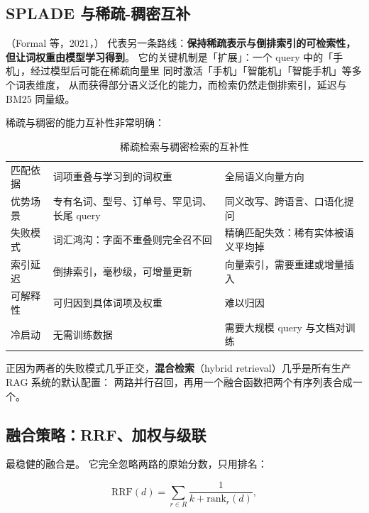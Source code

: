 \subsection{SPLADE 与稀疏-稠密互补}

（Formal 等，2021，\cite{formal2021splade}）
代表另一条路线：\textbf{保持稀疏表示与倒排索引的可检索性，但让词权重由模型学习得到}。
它的关键机制是「扩展」：一个 query 中的「手机」，经过模型后可能在稀疏向量里
同时激活「手机」「智能机」「智能手机」等多个词表维度，
从而获得部分语义泛化的能力，而检索仍然走倒排索引，延迟与 BM25 同量级。

稀疏与稠密的能力互补性非常明确：

\begin{table}[htbp]
\centering
\caption{稀疏检索与稠密检索的互补性}
\label{tab:sparse-dense}
\small
\begin{tabularx}{\textwidth}{L{2.6cm} L{4.6cm} Y}
\toprule
{} &  &  \\
\midrule
匹配依据 & 词项重叠与学习到的词权重 & 全局语义向量方向 \\
\addlinespace
优势场景 & 专有名词、型号、订单号、罕见词、长尾 query & 同义改写、跨语言、口语化提问 \\
\addlinespace
失败模式 & 词汇鸿沟：字面不重叠则完全召不回 & 精确匹配失效：稀有实体被语义平均掉 \\
\addlinespace
索引延迟 & 倒排索引，毫秒级，可增量更新 & 向量索引，需要重建或增量插入 \\
\addlinespace
可解释性 & 可归因到具体词项及权重 & 难以归因 \\
\addlinespace
冷启动 & 无需训练数据 & 需要大规模 query 与文档对训练 \\
\bottomrule
\end{tabularx}
\end{table}

正因为两者的失败模式几乎正交，\textbf{混合检索}（hybrid retrieval）几乎是所有生产 RAG 系统的默认配置：
两路并行召回，再用一个融合函数把两个有序列表合成一个。

\subsection{融合策略：RRF、加权与级联}

最稳健的融合是。
它完全忽略两路的原始分数，只用排名：

\begin{equation}
\text{RRF}(d) = \sum_{r \in R} \frac{1}{k + \text{rank}_r(d)} ,
\label{eq:rrf}
\end{equation}

